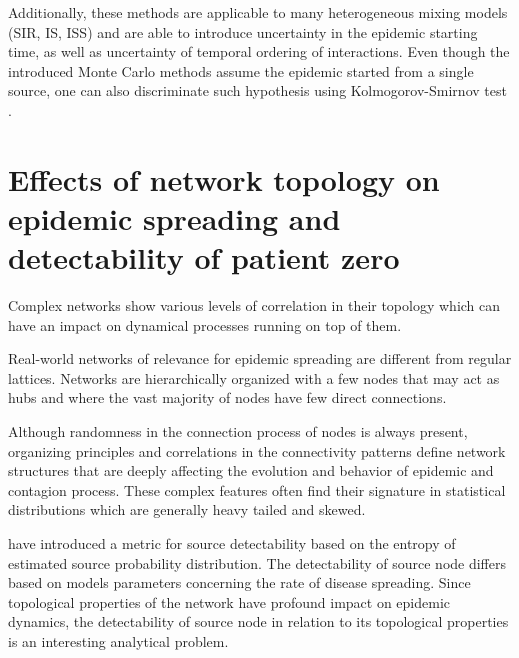 \documentclass[times, utf8, diplomski]{fer}
\begin{document}
Additionally, these methods are applicable to many heterogeneous mixing models (SIR, IS, ISS) and are able to introduce uncertainty in the epidemic starting time, as well as uncertainty of temporal ordering of interactions. 
Even though the introduced Monte Carlo methods assume the epidemic started from a single source, one can also discriminate such hypothesis using Kolmogorov-Smirnov test \cite{Nino}.

\section{Effects of network topology on epidemic spreading and detectability of patient zero}
Complex networks show various levels of correlation in their topology which can have an impact on dynamical processes running on top of them.

 
Real-world networks of relevance for epidemic spreading are different from regular lattices. Networks are hierarchically organized with a few nodes that may act as hubs and where the vast majority of nodes have few direct connections. 

Although randomness in the connection process of nodes is always present, organizing principles and correlations in the connectivity patterns define network structures that are deeply affecting the evolution and behavior of epidemic and contagion process. These  complex features often find their signature in statistical distributions which are generally heavy tailed and skewed. 

\citet{Nino} have  introduced a metric for source detectability based on the entropy of estimated source probability distribution. The detectability of source node differs based on models parameters concerning the rate of disease spreading. Since topological properties of the network  have profound impact on epidemic dynamics, the detectability of source node in relation to its topological properties is an interesting analytical problem.
\end{document}
